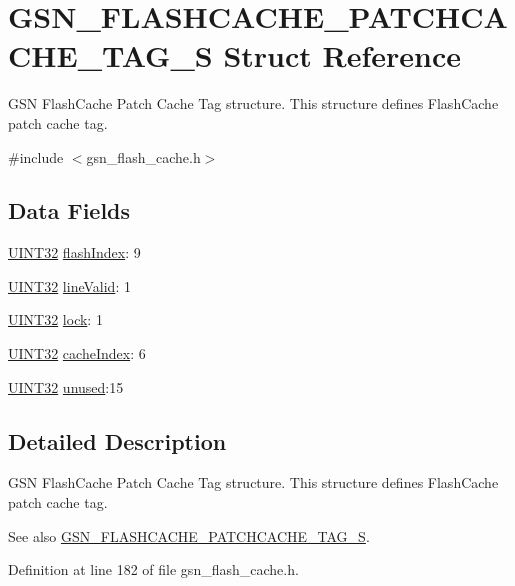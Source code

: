 \hypertarget{a00076}{
\section{GSN\_\-FLASHCACHE\_\-PATCHCACHE\_\-TAG\_\-S Struct Reference}
\label{a00076}
}


GSN FlashCache Patch Cache Tag structure. This structure defines FlashCache patch cache tag.  




{\ttfamily \#include $<$gsn\_\-flash\_\-cache.h$>$}

\subsection*{Data Fields}
\begin{DoxyCompactItemize}
\item 
\hyperlink{a00660_gae1e6edbbc26d6fbc71a90190d0266018}{UINT32} \hyperlink{a00076_a093f2ac10297235e5f9f4d147933fb82}{flashIndex}: 9
\item 
\hyperlink{a00660_gae1e6edbbc26d6fbc71a90190d0266018}{UINT32} \hyperlink{a00076_a08da0a4cd01c2d923e11a925ab10ee80}{lineValid}: 1
\item 
\hyperlink{a00660_gae1e6edbbc26d6fbc71a90190d0266018}{UINT32} \hyperlink{a00076_a8194ebd3fb1096ce9381524d63f2f512}{lock}: 1
\item 
\hyperlink{a00660_gae1e6edbbc26d6fbc71a90190d0266018}{UINT32} \hyperlink{a00076_a7bee5748a8e1349a2881ebec665458c9}{cacheIndex}: 6
\item 
\hyperlink{a00660_gae1e6edbbc26d6fbc71a90190d0266018}{UINT32} \hyperlink{a00076_a2c3ace150ddcb10d297a6d30b67d6330}{unused}:15
\end{DoxyCompactItemize}


\subsection{Detailed Description}
GSN FlashCache Patch Cache Tag structure. This structure defines FlashCache patch cache tag. 

\begin{DoxySeeAlso}{See also}
\hyperlink{a00076}{GSN\_\-FLASHCACHE\_\-PATCHCACHE\_\-TAG\_\-S}. 
\end{DoxySeeAlso}


Definition at line 182 of file gsn\_\-flash\_\-cache.h.



